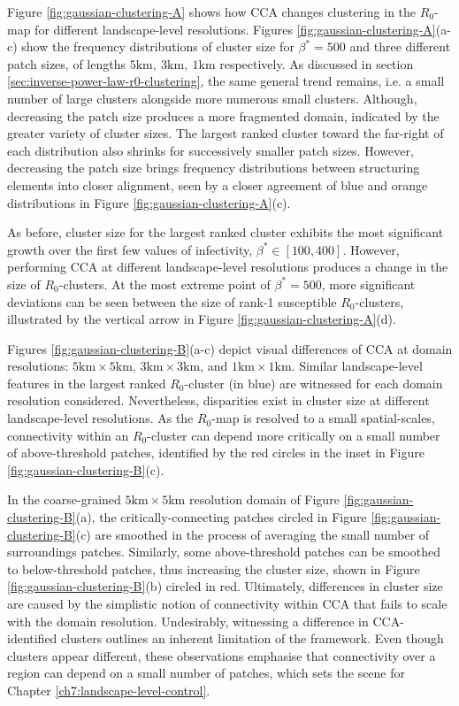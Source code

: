 Figure \ref{fig:gaussian-clustering-A} shows how CCA changes clustering in the $R_0$-map for different landscape-level resolutions.
Figures \ref{fig:gaussian-clustering-A}(a-c) show the frequency distributions of cluster size for $\beta^*=500$ and three different patch sizes, of lengths $\mathrm{5km,\ 3km,\ 1km}$ respectively.
As discussed in section \ref{sec:inverse-power-law-r0-clustering}, the same general trend remains, i.e. a small number of large clusters alongside more numerous small clusters.
Although, decreasing the patch size produces a more fragmented domain, indicated by the greater variety of cluster sizes.
The largest ranked cluster toward the far-right of each distribution also shrinks for successively smaller patch sizes.
However, decreasing the patch size brings frequency distributions between structuring elements into closer alignment, seen by a closer agreement of blue and orange distributions in Figure \ref{fig:gaussian-clustering-A}(c).

As before, cluster size for the largest ranked cluster exhibits the most significant growth over the first few values of infectivity, 
$\beta^* \in [100, 400]$. However, performing CCA at different landscape-level resolutions produces a change in the size of $R_0$-clusters.
At the most extreme point of $\beta^*=500$, more significant deviations can be seen between the size of rank-1 susceptible $R_0$-clusters,
illustrated by the vertical arrow in Figure \ref{fig:gaussian-clustering-A}(d).

Figures \ref{fig:gaussian-clustering-B}(a-c) depict visual differences of CCA at domain resolutions: $\mathrm{5km \times 5km}$, $\mathrm{3km\times 3km}$, and $\mathrm{1km\times 1km}$.
Similar landscape-level features in the largest ranked $R_0$-cluster (in blue) are witnessed for each domain resolution considered.
Nevertheless, disparities exist in cluster size at different landscape-level resolutions.
As the $R_0$-map is resolved to a small spatial-scales, connectivity within an $R_0$-cluster 
can depend more critically on a small number of above-threshold patches, identified by the red circles in the inset in Figure \ref{fig:gaussian-clustering-B}(c).

In the coarse-grained $\mathrm{5km\times 5km}$ resolution domain of Figure \ref{fig:gaussian-clustering-B}(a), 
the critically-connecting patches circled in Figure \ref{fig:gaussian-clustering-B}(c) are smoothed in the process of averaging the small number of surroundings patches. 
Similarly, some above-threshold patches can be smoothed to below-threshold patches, thus increasing the cluster size, shown in Figure \ref{fig:gaussian-clustering-B}(b) circled in red.
Ultimately, differences in cluster size are caused by the simplistic notion of connectivity within CCA that fails to scale with the domain resolution.
Undesirably, witnessing a difference in CCA-identified clusters outlines an inherent limitation of the framework.
Even though clusters appear different, these observations emphasise that connectivity over a region can depend on a small number of patches, 
which sets the scene for Chapter \ref{ch7:landscape-level-control}.

